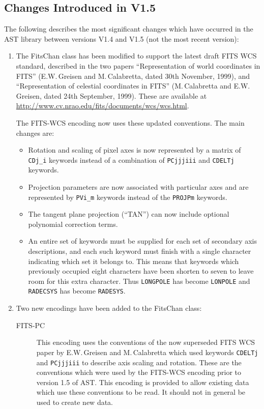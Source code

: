\documentclass[twoside,11pt]{starlink}
\begin{document}
\subsection{Changes Introduced in V1.5}

The following describes the most significant changes which have
occurred in the AST library between versions V1.4 and V1.5 (not the most
recent version):

\begin{enumerate}

\item The FitsChan class has been modified to support the latest draft
FITS WCS standard, described in the two papers ``Representation of world
coordinates in FITS'' (E.W.\,Greisen and M.\,Calabretta, dated 30th
November, 1999), and ``Representation of celestial coordinates in FITS''
(M.\,Calabretta and E.W.\,Greisen, dated 24th September, 1999). These are
available at
\url{http://www.cv.nrao.edu/fits/documents/wcs/wcs.html}.

The FITS-WCS encoding now uses these updated conventions. The main
changes are:

\begin{itemize}
\item Rotation and scaling of pixel axes is now represented by a matrix
of \texttt{CDj\_i} keywords instead of a combination of \texttt{PCjjjiii} and
\texttt{CDELTj} keywords.
\item Projection parameters are now associated with particular axes and
are represented by \texttt{PVi\_m} keywords instead of the \texttt{PROJPm}
keywords.
\item The tangent plane projection (``TAN'') can now include optional
polynomial correction terms.
\item An entire set of keywords must be supplied for each set of secondary
axis descriptions, and each such keyword must finish with a single
character indicating which set it belongs to. This means that keywords
which previously occupied eight characters have been shorten to seven to
leave room for this extra character. Thus \texttt{LONGPOLE} has become \texttt{LONPOLE} and \texttt{RADECSYS} has become \texttt{RADESYS}.
\end{itemize}

\item Two new encodings have been added to the FitsChan class:
\begin{description}

\item [FITS-PC] This encoding uses the conventions of the now superseded
FITS WCS paper by E.W.\,Greisen and M.\,Calabretta which used keywords
\texttt{CDELTj} and \texttt{PCjjjiii} to describe axis scaling and rotation.
These are the conventions which were used by the FITS-WCS encoding prior
to version 1.5 of AST. This encoding is provided to allow existing data
which use these conventions to be read. It should not in general be used
to create new data.


\end{description}
\end{enumerate}
\end{document}
